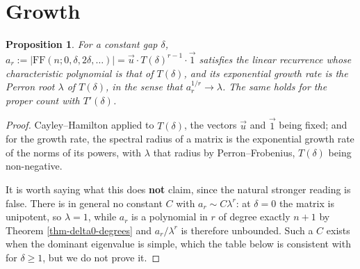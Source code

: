 \documentclass[11pt, a4paper, abstract=yes]{scrartcl}
\theoremstyle{definition}
\theoremstyle{remark}
\theoremstyle{plain}
\newtheorem{proposition}[definition]{Proposition}
\begin{document}
\section{Growth}
\label{sec-growth}
\begin{proposition}
For a constant gap \(\delta\), \(a_r:=|\mathrm{FF}(n;0,\delta,2\delta,\dots)|=\vec u\cdot
T(\delta)^{r-1}\cdot\vec 1\) satisfies the linear recurrence whose characteristic polynomial is
that of \(T(\delta)\), and its exponential growth rate is the Perron root \(\lambda\) of
\(T(\delta)\), in the sense that \(a_r^{1/r}\to\lambda\). The same holds for the proper count with
\(T'(\delta)\).
\label{prop-recurrence}
\end{proposition}

\begin{proof}
Cayley--Hamilton applied to \(T(\delta)\), the vectors \(\vec u\) and \(\vec 1\) being fixed; and for
the growth rate, the spectral radius of a matrix is the exponential growth rate of the norms of its
powers, with \(\lambda\) that radius by Perron--Frobenius, \(T(\delta)\) being non-negative.

It is worth saying what this does \textbf{not} claim, since the natural stronger reading is false. There is
in general no constant \(C\) with \(a_r\sim C\lambda^r\): at \(\delta=0\) the matrix is unipotent, so
\(\lambda=1\), while \(a_r\) is a polynomial in \(r\) of degree exactly \(n+1\) by
Theorem \ref{thm-delta0-degrees} and \(a_r/\lambda^r\) is therefore unbounded. Such a \(C\) exists when
the dominant eigenvalue is simple, which the table below is consistent with for \(\delta\ge1\), but we
do not prove it.
\end{proof}
\end{document}
